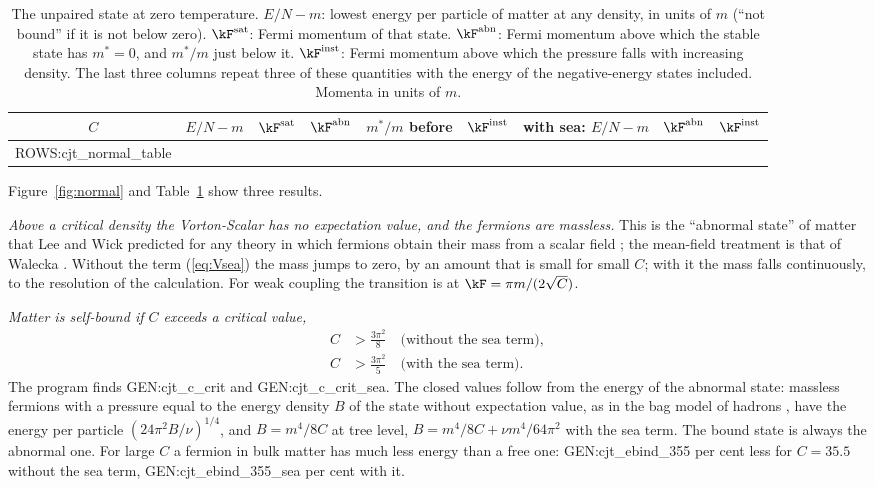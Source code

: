 \begin{table}
\caption{\label{tab:normal}The unpaired state at zero temperature. $E/N-m$: lowest energy per particle
of matter at any density, in units of $m$ (``not bound'' if it is not below zero). $\kF^{\rm sat}$:
Fermi momentum of that state. $\kF^{\rm abn}$: Fermi momentum above which the stable state has
$m^*=0$, and $m^*/m$ just below it. $\kF^{\rm inst}$: Fermi momentum above which the pressure falls
with increasing density. The last three columns repeat three of these quantities with the energy of
the negative-energy states included. Momenta in units of $m$.}
\begin{ruledtabular}
\begin{tabular}{ccccccccc}
$C$ & $E/N-m$ & $\kF^{\rm sat}$ & $\kF^{\rm abn}$ & $m^*/m$ before & $\kF^{\rm inst}$ & with sea: $E/N-m$ & $\kF^{\rm abn}$ & $\kF^{\rm inst}$ \\
\hline
{{ROWS:cjt_normal_table}}
\end{tabular}
\end{ruledtabular}
\end{table}

Figure~\ref{fig:normal} and Table~\ref{tab:normal} show three results.

\emph{Above a critical density the Vorton-Scalar has no expectation value, and the fermions are
massless.} This is the ``abnormal state'' of matter that Lee and Wick predicted for any theory in
which fermions obtain their mass from a scalar field \cite{LeeWick1974}; the mean-field treatment is
that of Walecka \cite{Walecka1974,Chin1977}. Without the term (\ref{eq:Vsea}) the mass jumps to zero,
by an amount that is small for small $C$; with it the mass falls continuously, to the resolution of
the calculation. For weak coupling the transition is at $\kF=\pi m/(2\sqrt C)$.

\emph{Matter is self-bound if $C$ exceeds a critical value,}
\begin{align}
C&>\frac{3\pi^2}{8}\quad\text{(without the sea term)},\nonumber\\
C&>\frac{3\pi^2}{5}\quad\text{(with the sea term)}.
\label{eq:Ccrit}
\end{align}
The program finds {{GEN:cjt_c_crit}} and {{GEN:cjt_c_crit_sea}}. The closed values follow from the
energy of the abnormal state: massless fermions with a pressure equal to the energy density $B$ of
the state without expectation value, as in the bag model of hadrons \cite{Chodos1974}, have the
energy per particle $(24\pi^2B/\nu)^{1/4}$, and $B=m^4/8C$ at tree level,
$B=m^4/8C+\nu m^4/64\pi^2$ with the sea term. The bound state is always the abnormal one. For large
$C$ a fermion in bulk matter has much less energy than a free one: {{GEN:cjt_ebind_355}} per cent
less for $C=35.5$ without the sea term, {{GEN:cjt_ebind_355_sea}} per cent with it.

